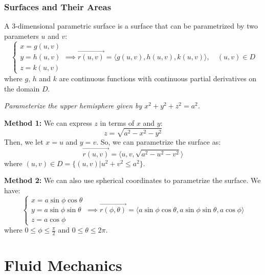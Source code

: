 \documentclass[11pt]{report}
\begin{document}
\subsection{Surfaces and Their Areas}
\begin{definition}
    A 3-dimensional parametric surface is a surface that can be parametrized by two parameters \(u\) and \(v\):
    \begin{equation}
        \begin{cases}
            x = g(u,v) \\
            y = h(u,v) \\
            z = k(u,v)
        \end{cases} \implies \vec{r(u,v)} = \langle g(u,v), h(u,v), k(u,v) \rangle, \quad (u,v) \in D
    \end{equation}
    where \(g\), \(h\) and \(k\) are continuous functions with continuous partial derivatives on the domain \(D\).
\end{definition}

\begin{example}
    \textit{Parameterize the upper hemisphere given by \(x^2 + y^2 + z^2 = a^2\).}

    \textbf{Method 1:} We can express \(z\) in terms of \(x\) and \(y\):
    $$    
        z = \sqrt{a^2 - x^2 - y^2}
    $$
    Then, we let $x = u$ and $y = v$. So, we can parametrize the surface as:
    $$    
        \vec{r(u,v)} = \langle u, v, \sqrt{a^2 - u^2 - v^2} \rangle
    $$
    where \((u,v) \in D = \{(u,v) | u^2 + v^2 \leq a^2\}\).

    \textbf{Method 2:} We can also use spherical coordinates to parametrize the surface. We have:
    $$    
        \begin{cases}
            x = a \sin \phi \cos \theta \\
            y = a \sin \phi \sin \theta \\
            z = a \cos \phi
        \end{cases} \implies \vec{r(\phi, \theta)} = \langle a \sin \phi \cos \theta, a \sin \phi \sin \theta, a \cos \phi \rangle
    $$
    where \(0 \leq \phi \leq \frac{\pi}{2}\) and \(0 \leq \theta \leq 2\pi\).
\end{example}

\chapter{Fluid Mechanics}
\end{document}
